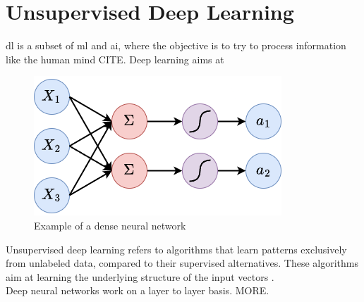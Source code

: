 \section{Unsupervised Deep Learning}

\acrfull{dl} is a subset of \acrshort{ml} and \acrshort{ai}, where the objective is to try to process information like the human mind CITE. 
Deep learning aims at 

\begin{figure}[!h]
    \centering
    \includegraphics[width=0.5\linewidth]{figures/linearlayer.png}
    \caption{Example of a dense neural network}
    \label{fig:densenn}
\end{figure}


Unsupervised deep learning refers to algorithms that learn patterns exclusively from unlabeled data, compared to their supervised alternatives. These algorithms aim at learning the underlying structure of the input vectors \cite{KARHUNEN2015125}. \\

Deep neural networks work on a layer to layer basis. MORE. \\







\clearpage

\clearpage

